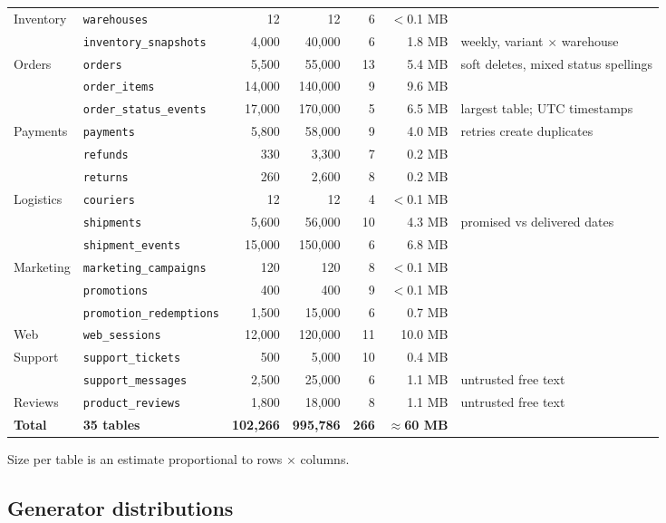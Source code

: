\documentclass[11pt,a4paper]{article}
\newcommand{\code}[1]{\texttt{\small #1}}
\begin{document}
{\begin{longtable}{@{}l l r r r r >{\raggedright\arraybackslash}p{3.1cm}@{}}
Inventory & \code{warehouses} & 12 & 12 & 6 & $<$0.1 MB & \\
 & \code{inventory\_snapshots} & 4,000 & 40,000 & 6 & 1.8 MB & weekly, variant $\times$ warehouse\\
Orders & \code{orders} & 5,500 & 55,000 & 13 & 5.4 MB & soft deletes, mixed status spellings\\
 & \code{order\_items} & 14,000 & 140,000 & 9 & 9.6 MB & \\
 & \code{order\_status\_events} & 17,000 & 170,000 & 5 & 6.5 MB & largest table; UTC timestamps\\
Payments & \code{payments} & 5,800 & 58,000 & 9 & 4.0 MB & retries create duplicates\\
 & \code{refunds} & 330 & 3,300 & 7 & 0.2 MB & \\
 & \code{returns} & 260 & 2,600 & 8 & 0.2 MB & \\
Logistics & \code{couriers} & 12 & 12 & 4 & $<$0.1 MB & \\
 & \code{shipments} & 5,600 & 56,000 & 10 & 4.3 MB & promised vs delivered dates\\
 & \code{shipment\_events} & 15,000 & 150,000 & 6 & 6.8 MB & \\
Marketing & \code{marketing\_campaigns} & 120 & 120 & 8 & $<$0.1 MB & \\
 & \code{promotions} & 400 & 400 & 9 & $<$0.1 MB & \\
 & \code{promotion\_redemptions} & 1,500 & 15,000 & 6 & 0.7 MB & \\
Web & \code{web\_sessions} & 12,000 & 120,000 & 11 & 10.0 MB & \\
Support & \code{support\_tickets} & 500 & 5,000 & 10 & 0.4 MB & \\
 & \code{support\_messages} & 2,500 & 25,000 & 6 & 1.1 MB & untrusted free text\\
Reviews & \code{product\_reviews} & 1,800 & 18,000 & 8 & 1.1 MB & untrusted free text\\
\midrule
\textbf{Total} & \textbf{35 tables} & \textbf{102,266} & \textbf{995,786} & \textbf{266} & \textbf{$\approx$60 MB} & \\
\bottomrule
\end{longtable}
}
{\footnotesize\color{grey} Size per table is an estimate proportional to rows $\times$ columns.}

\subsection{Generator distributions}
\end{document}
